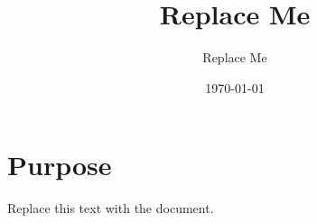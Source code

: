 \documentclass[11pt]{scrartcl}
\title{Replace Me}
\author{Replace Me}
\date{\today}
\begin{document}
\maketitle

\section{Purpose}

Replace this text with the document.
\end{document}
